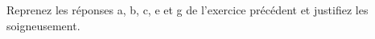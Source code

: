 
\begin{exercice}\label{exo0018}

Reprenez les réponses a, b, c, e et g de l'exercice précédent et justifiez les soigneusement.

\end{exercice}
